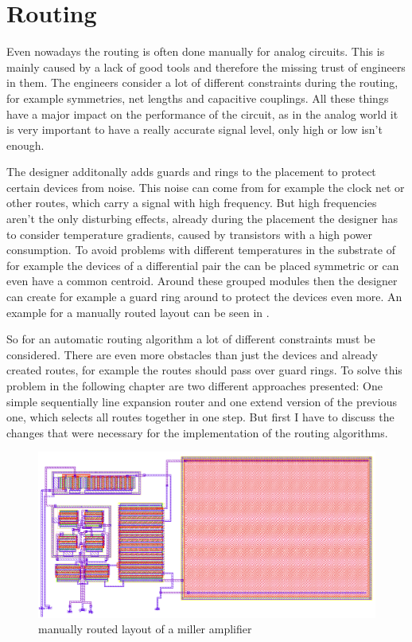 \chapter{Routing}

Even nowadays the routing is often done manually for analog circuits. This is mainly caused by a lack of good tools and therefore the missing trust of engineers in them. The engineers consider a lot of different constraints during the routing, for example symmetries, net lengths and capacitive couplings. All these things have a major impact on the performance of the circuit, as in the analog world it is very important to have a really accurate signal level, only high or low isn't enough.

The designer additonally adds guards and rings to the placement to protect certain devices from noise. This noise can come from for example the clock net or other routes, which carry a signal with high frequency. But high frequencies aren't the only disturbing effects, already during the placement the designer has to consider temperature gradients, caused by transistors with a high power consumption. To avoid problems with different temperatures in the substrate of for example the devices of a differential pair the can be placed symmetric or can even have a common centroid. Around these grouped modules then the designer can create for example a guard ring around to protect the devices even more. An example for a manually routed layout can be seen in .

So for an automatic routing algorithm a lot of different constraints must be considered. There are even more obstacles than just the devices and already created routes, for example the routes should pass over guard rings. To solve this problem in the following chapter are two different approaches presented: One simple sequentially line expansion router and one extend version of the previous one, which selects all routes together in one step. But first I have to discuss the changes that were necessary for the implementation of the routing algorithms.

\begin{figure}
	\centering
	\includegraphics[scale=.4]{FIG/miller_amplifier_layout_routed.png}
  	\caption{manually routed layout of a miller amplifier}
	\label{fig:miller_amplifier_routed_layout}
\end{figure}

